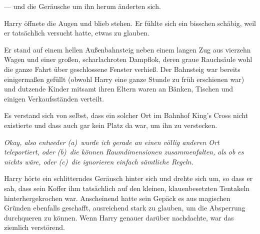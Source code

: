 — und die Geräusche um ihn herum änderten sich.

Harry öffnete die Augen und blieb stehen. Er fühlte sich ein bisschen schäbig, weil er tatsächlich versucht hatte, etwas zu glauben.

Er stand auf einem hellen Außenbahnsteig neben einem langen Zug aus vierzehn Wagen und einer großen, scharlachroten Dampflok, deren graue Rauchsäule wohl die ganze Fahrt über geschlossene Fenster verhieß. Der Bahnsteig war bereits einigermaßen gefüllt (obwohl Harry eine ganze Stunde zu früh erschienen war) und dutzende Kinder mitsamt ihren Eltern waren an Bänken, Tischen und einigen Verkaufsständen verteilt.

Es verstand sich von selbst, dass ein solcher Ort im Bahnhof King’s Cross nicht existierte und dass auch gar kein Platz da war, um ihn zu verstecken.

\emph{Okay, also entweder (a)~wurde ich gerade an einen völlig anderen Ort teleportiert, oder (b)~die können Raumdimensionen zusammenfalten, als ob es nichts wäre, oder (c)~die ignorieren einfach sämtliche Regeln.}

Harry hörte ein schlitterndes Geräusch hinter sich und drehte sich um, so dass er sah, dass sein Koffer ihm tatsächlich auf den kleinen, klauenbesetzten Tentakeln hinterhergekrochen war. Anscheinend hatte sein Gepäck es aus magischen Gründen ebenfalls geschafft, ausreichend stark zu glauben, um die Absperrung durchqueren zu können. Wenn Harry genauer darüber nachdachte, war das ziemlich verstörend.

